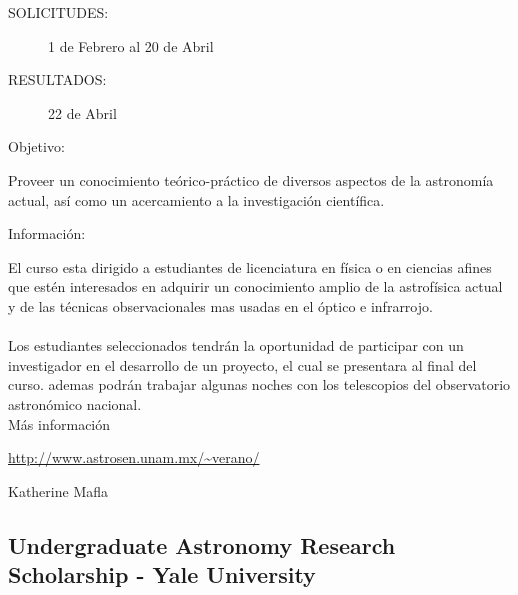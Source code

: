 \documentclass{book}
\begin{document}
\begin{description}
\item[SOLICITUDES:] 1 de Febrero al 20 de Abril

\item[RESULTADOS:] 22 de Abril

\item[Objetivo:]
\end{description}
Proveer un conocimiento teórico-práctico de diversos aspectos de la astronomía actual, así como un acercamiento a la investigación científica.
\begin{description}
\item[Información:]
\end{description}
El curso esta dirigido a estudiantes de licenciatura en física o en ciencias afines que estén interesados en adquirir un conocimiento amplio de la astrofísica actual y de las técnicas observacionales mas usadas en el óptico e infrarrojo.\\
\\
Los estudiantes seleccionados tendrán la oportunidad de participar con un investigador en el desarrollo de un proyecto, el cual se presentara al final del curso. ademas podrán trabajar algunas noches con los telescopios del observatorio astronómico nacional.\\

Más información 
\begin{center}
\url{http://www.astrosen.unam.mx/~verano/}
\end{center}
\begin{flushright}
Katherine Mafla
\end{flushright}

\subsection{Undergraduate Astronomy Research Scholarship - Yale University}
\end{document}
